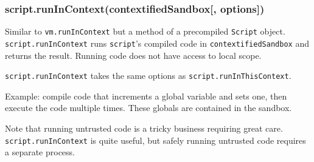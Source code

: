 \subsubsection{script.runInContext(contextifiedSandbox{[},
options{]})}\label{script.runincontextcontextifiedsandbox-options}

Similar to \texttt{vm.runInContext} but a method of a precompiled
\texttt{Script} object. \texttt{script.runInContext} runs
\texttt{script}'s compiled code in \texttt{contextifiedSandbox} and
returns the result. Running code does not have access to local scope.

\texttt{script.runInContext} takes the same options as
\texttt{script.runInThisContext}.

Example: compile code that increments a global variable and sets one,
then execute the code multiple times. These globals are contained in the
sandbox.

\begin{Shaded}
\begin{Highlighting}[]
 \NormalTok{(}\NormalTok{);}
 \NormalTok{(}\NormalTok{);}

 
  \NormalTok{: }\NormalTok{,}
  \NormalTok{: }
\NormalTok{\};}

  \NormalTok{(}\NormalTok{);}

 \NormalTok{(} 
\NormalTok{\}}

\NormalTok{(}

\end{Highlighting}
\end{Shaded}

Note that running untrusted code is a tricky business requiring great
care. \texttt{script.runInContext} is quite useful, but safely running
untrusted code requires a separate process.


